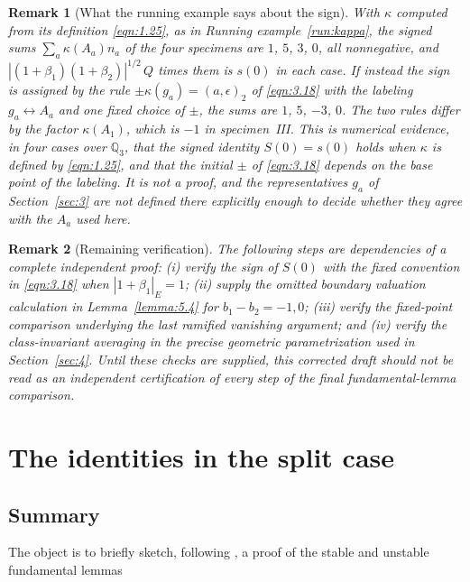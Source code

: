 \documentclass[12pt,letterpaper]{amsart}
\numberwithin{equation}{section}
\newtheorem{draftremark}{Remark}
\theoremstyle{definition}
\theoremstyle{plain}
\begin{document}
\begin{draftremark}[What the running example says about the sign]
\label{rem:sign-evidence}
With $\kappa$ computed from its definition \eqref{eqn:1.25}, as in
Running example~\ref{run:kappa}, the signed sums
$\sum_a\kappa(A_a)n_a$ of the four specimens are $1$, $5$, $3$, $0$,
all nonnegative, and $|(1+\beta_1)(1+\beta_2)|^{1/2}\,Q$ times them is
$s(0)$ in each case. If instead the sign is assigned by the rule
$\pm\kappa(g_a)=(a,\epsilon)_2$ of \eqref{eqn:3.18} with the labeling
$g_a\leftrightarrow A_a$ and one fixed choice of $\pm$, the sums are
$1$, $5$, $-3$, $0$. The two rules differ by the factor
$\kappa(A_1)$, which is $-1$ in specimen~III. This is numerical
evidence, in four cases over $\mathbb Q_3$, that the signed identity
$S(0)=s(0)$ holds when $\kappa$ is defined by \eqref{eqn:1.25}, and
that the initial $\pm$ of \eqref{eqn:3.18} depends on the base point
of the labeling. It is not a proof, and the representatives $g_a$ of
Section~\ref{sec:3} are not defined there explicitly enough to decide
whether they agree with the $A_a$ used here.
\end{draftremark}

\begin{draftremark}[Remaining verification]
The following steps are dependencies of a complete independent proof:
(i) verify the sign of $S(0)$ with the fixed convention in
\eqref{eqn:3.18} when $|1+\beta_1|_E=1$;
(ii) supply the omitted boundary valuation calculation in
Lemma~\ref{lemma:5.4} for $b_1-b_2=-1,0$;
(iii) verify the fixed-point comparison underlying the last ramified
vanishing argument; and (iv) verify the class-invariant averaging
in the precise geometric parametrization used in Section~\ref{sec:4}.
Until these checks are supplied, this corrected draft should not be
read as an independent certification of every step of the final
fundamental-lemma comparison.
\end{draftremark}

 

\section{The identities in the split case}
\label{sec:2}

\subsection{Summary}

The object is to briefly sketch, following \cite{LaUn}, a proof of the stable
and unstable fundamental lemmas
\end{document}
